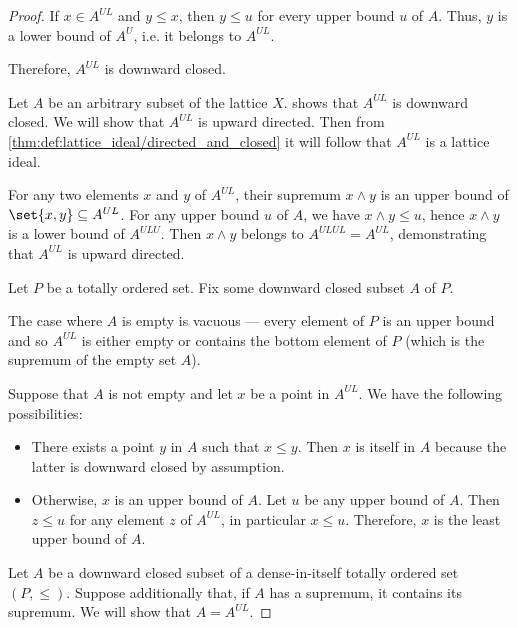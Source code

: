 \begin{proof}
   If \( x \in A^{UL} \) and \( y \leq x \), then \( y \leq u \) for every upper bound \( u \) of \( A \). Thus, \( y \) is a lower bound of \( A^U \), i.e. it belongs to \( A^{UL} \).

  Therefore, \( A^{UL} \) is downward closed.

   Let \( A \) be an arbitrary subset of the lattice \( X \).  shows that \( A^{UL} \) is downward closed. We will show that \( A^{UL} \) is upward directed. Then from \cref{thm:def:lattice_ideal/directed_and_closed} it will follow that \( A^{UL} \) is a lattice ideal.

  For any two elements \( x \) and \( y \) of \( A^{UL} \), their supremum \( x \wedge y \) is an upper bound of \( \set{ x, y } \subseteq A^{UL} \). For any upper bound \( u \) of \( A \), we have \( x \wedge y \leq u \), hence \( x \wedge y \) is a lower bound of \( A^{ULU} \). Then \( x \wedge y \) belongs to \( A^{ULUL} = A^{UL} \), demonstrating that \( A^{UL} \) is upward directed.

   Let \( P \) be a totally ordered set. Fix some downward closed subset \( A \) of \( P \).

  The case where \( A \) is empty is vacuous --- every element of \( P \) is an upper bound and so \( A^{UL} \) is either empty or contains the bottom element of \( P \) (which is the supremum of the empty set \( A \)).

  Suppose that \( A \) is not empty and let \( x \) be a point in \( A^{UL} \). We have the following possibilities:
  \begin{itemize}
    \item There exists a point \( y \) in \( A \) such that \( x \leq y \). Then \( x \) is itself in \( A \) because the latter is downward closed by assumption.
    \item Otherwise, \( x \) is an upper bound of \( A \). Let \( u \) be any upper bound of \( A \). Then \( z \leq u \) for any element \( z \) of \( A^{UL} \), in particular \( x \leq u \). Therefore, \( x \) is the least upper bound of \( A \).
  \end{itemize}

   Let \( A \) be a downward closed subset of a dense-in-itself totally ordered set \( (P, \leq) \). Suppose additionally that, if \( A \) has a supremum, it contains its supremum. We will show that \( A = A^{UL} \).


\end{proof}
